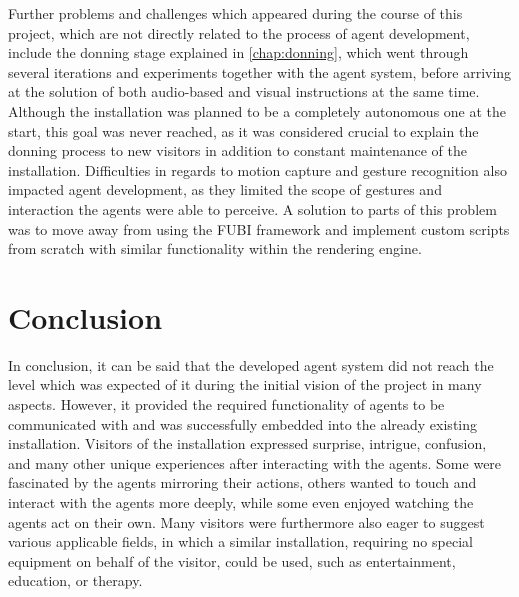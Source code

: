 \documentclass[draft,final]{vutinfth} %
\begin{document}
Further problems and challenges which appeared during the course of this project, which are not directly related to the process of agent development, include the donning stage explained in \autoref{chap:donning}, which went through several iterations and experiments together with the agent system, before arriving at the solution of both audio-based and visual instructions at the same time. 
Although the installation was planned to be a completely autonomous one at the start, this goal was never reached, as it was considered crucial to explain the donning process to new visitors in addition to constant maintenance of the installation. 
Difficulties in regards to motion capture and gesture recognition also impacted agent development, as they limited the scope of gestures and interaction the agents were able to perceive. 
A solution to parts of this problem was to move away from using the FUBI framework and implement custom scripts from scratch with similar functionality within the rendering engine.

\section{Conclusion}
\label{conclusion}

In conclusion, it can be said that the developed agent system did not reach the level which was expected of it during the initial vision of the project in many aspects. 
However, it provided the required functionality of agents to be communicated with and was successfully embedded into the already existing installation. 
Visitors of the installation expressed surprise, intrigue, confusion, and many other unique experiences after interacting with the agents. 
Some were fascinated by the agents mirroring their actions, others wanted to touch and interact with the agents more deeply, while some even enjoyed watching the agents act on their own. 
Many visitors were furthermore also eager to suggest various applicable fields, in which a similar installation, requiring no special equipment on behalf of the visitor, could be used, such as entertainment, education, or therapy. 



\backmatter

\listoffigures %

\cleardoublepage %
\listoftables %

\listofalgorithms
{}

\printindex

\printglossaries



\end{document}
